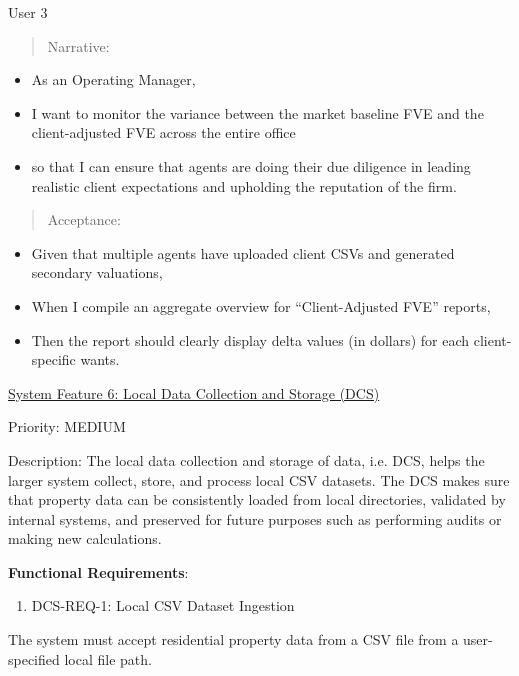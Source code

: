 \documentclass[
]{article}
\begin{document}
User 3

\begin{quote}
Narrative:
\end{quote}

\begin{itemize}
\item
  As an Operating Manager,
\item
  I want to monitor the variance between the market baseline FVE and the
  client-adjusted FVE across the entire office
\item
  so that I can ensure that agents are doing their due diligence in
  leading realistic client expectations and upholding the reputation of
  the firm.
\end{itemize}

\begin{quote}
Acceptance:
\end{quote}

\begin{itemize}
\item
  Given that multiple agents have uploaded client CSVs and generated
  secondary valuations,
\item
  When I compile an aggregate overview for ``Client-Adjusted FVE''
  reports,
\item
  Then the report should clearly display delta values (in dollars) for
  each client-specific wants.
\end{itemize}

\ul{System Feature 6: Local Data Collection and Storage (DCS)}

Priority: MEDIUM

Description: The local data collection and storage of data, i.e. DCS,
helps the larger system collect, store, and process local CSV datasets.
The DCS makes sure that property data can be consistently loaded from
local directories, validated by internal systems, and preserved for
future purposes such as performing audits or making new calculations.

\textbf{Functional Requirements}:

\begin{enumerate}
\def\labelenumi{\Roman{enumi})}
\setcounter{enumi}{2}
\item
  DCS-REQ-1: Local CSV Dataset Ingestion
\end{enumerate}

The system must accept residential property data from a CSV file from a
user-specified local file path.
\end{document}
